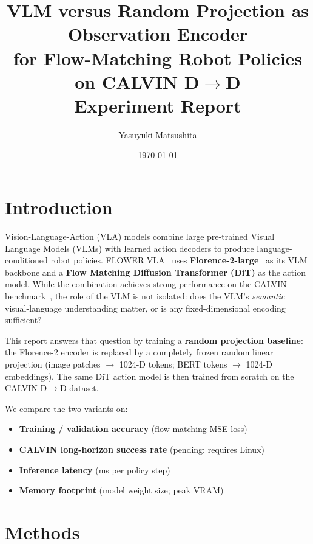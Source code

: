 \documentclass[11pt,a4paper]{article}
\title{\textbf{VLM versus Random Projection as Observation Encoder\\
               for Flow-Matching Robot Policies on CALVIN D$\rightarrow$D}\\[0.5em]
  \large Experiment Report}
\author{Yasuyuki Matsushita}
\date{\today}
\begin{document}
\maketitle
\tableofcontents
\newpage

\section{Introduction}
\label{sec:intro}

Vision-Language-Action (VLA) models combine large pre-trained Visual Language
Models (VLMs) with learned action decoders to produce language-conditioned
robot policies.  FLOWER VLA~\cite{breuss2025flower} uses
\textbf{Florence-2-large}~\cite{xiao2024florence2} as its VLM backbone and
a \textbf{Flow Matching Diffusion Transformer (DiT)} as the action model.
While the combination achieves strong performance on the CALVIN
benchmark~\cite{mees2022calvin}, the role of the VLM is not isolated: does the
VLM's \emph{semantic} visual-language understanding matter, or is any
fixed-dimensional encoding sufficient?

This report answers that question by training a \textbf{random projection
baseline}: the Florence-2 encoder is replaced by a completely frozen random
linear projection (image patches $\to$ 1024-D tokens; BERT tokens $\to$
1024-D embeddings).  The same DiT action model is then trained from scratch on
the CALVIN D$\rightarrow$D dataset.

We compare the two variants on:
\begin{itemize}
  \item \textbf{Training / validation accuracy} (flow-matching MSE loss)
  \item \textbf{CALVIN long-horizon success rate} (pending: requires Linux)
  \item \textbf{Inference latency} (ms per policy step)
  \item \textbf{Memory footprint} (model weight size; peak VRAM)
\end{itemize}

\section{Methods}
\label{sec:methods}
\end{document}
